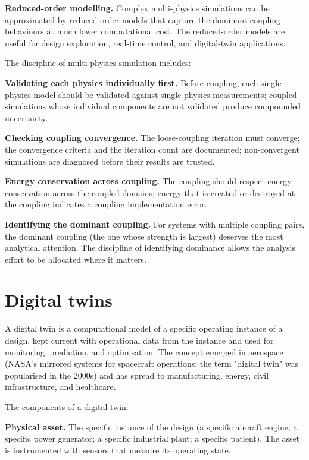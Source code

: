 \textbf{Reduced-order modelling.} Complex multi-physics simulations can be approximated by reduced-order models that capture the dominant coupling behaviours at much lower computational cost. The reduced-order models are useful for design exploration, real-time control, and digital-twin applications.

The discipline of multi-physics simulation includes:

\textbf{Validating each physics individually first.} Before coupling, each single-physics model should be validated against single-physics measurements; coupled simulations whose individual components are not validated produce compounded uncertainty.

\textbf{Checking coupling convergence.} The loose-coupling iteration must converge; the convergence criteria and the iteration count are documented; non-convergent simulations are diagnosed before their results are trusted.

\textbf{Energy conservation across coupling.} The coupling should respect energy conservation across the coupled domains; energy that is created or destroyed at the coupling indicates a coupling implementation error.

\textbf{Identifying the dominant coupling.} For systems with multiple coupling pairs, the dominant coupling (the one whose strength is largest) deserves the most analytical attention. The discipline of identifying dominance allows the analysis effort to be allocated where it matters.

\section{Digital twins}

A digital twin is a computational model of a specific operating instance of a design, kept current with operational data from the instance and used for monitoring, prediction, and optimisation. The concept emerged in aerospace (NASA's mirrored systems for spacecraft operations; the term "digital twin" was popularised in the 2000s) and has spread to manufacturing, energy, civil infrastructure, and healthcare.

The components of a digital twin:

\textbf{Physical asset.} The specific instance of the design (a specific aircraft engine; a specific power generator; a specific industrial plant; a specific patient). The asset is instrumented with sensors that measure its operating state.

